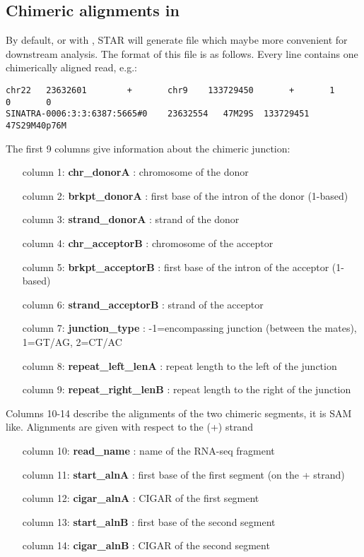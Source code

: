 \documentclass[12pt]{article}
\begin{document}
\subsection{Chimeric alignments in }
By default, or with  , STAR will generate  file which maybe more convenient for downstream analysis.
The format of this file is as follows. Every line contains one chimerically aligned read, e.g.:
\begin{verbatim}
chr22   23632601        +       chr9    133729450       +       1       0       0
SINATRA-0006:3:3:6387:5665#0    23632554   47M29S  133729451       47S29M40p76M
\end{verbatim}

The first 9 columns give information about the chimeric junction:
\begin{itemize}[leftmargin=1in]
\item[column 1:] \textbf{chr\_donorA} : chromosome of the donor
\item[column 2:] \textbf{brkpt\_donorA} : first base of the intron of the donor (1-based)
\item[column 3:] \textbf{strand\_donorA} : strand of the donor
\item[column 4:] \textbf{chr\_acceptorB} : chromosome of the acceptor
\item[column 5:] \textbf{brkpt\_acceptorB} : first base of the intron of the acceptor (1-based)
\item[column 6:] \textbf{strand\_acceptorB} : strand of the acceptor
\item[column 7:] \textbf{junction\_type} : -1=encompassing junction (between the mates), 1=GT/AG, 2=CT/AC
\item[column 8:] \textbf{repeat\_left\_lenA} : repeat length to the left of the junction
\item[column 9:] \textbf{repeat\_right\_lenB} : repeat length to the right of the junction
\end{itemize}

Columns 10-14 describe the alignments of the two chimeric segments, it is SAM like. Alignments are given with respect to the (+) strand
\begin{itemize}[leftmargin=1in]
\item[column 10:] \textbf{read\_name} : name of the RNA-seq fragment
\item[column 11:] \textbf{start\_alnA} : first base of the first segment (on the + strand)
\item[column 12:] \textbf{cigar\_alnA} : CIGAR of the first segment
\item[column 13:] \textbf{start\_alnB} : first base of the second segment
\item[column 14:] \textbf{cigar\_alnB} : CIGAR of the second segment
\end{itemize}
\end{document}
